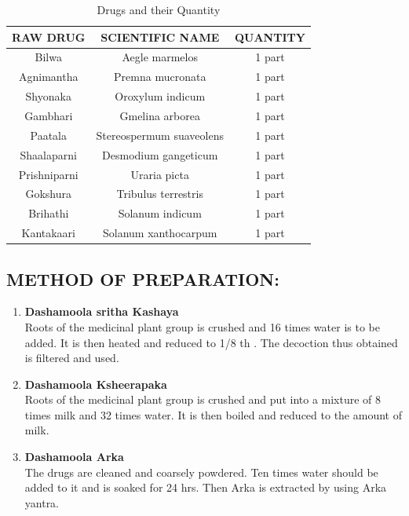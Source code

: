 \documentclass[11pt]{report} %
\begin{document}
\begin{table}[h]
	\centering
	\caption{Drugs and their Quantity}
	\label{tab:Raw Drug}
	\begin{tabular}{|c|c|c|}
		\hline
		RAW DRUG                            & SCIENTIFIC NAME          & QUANTITY         \\ \hline
		Bilwa                               & Aegle marmelos           & 1 part   \\ \hline
		Agnimantha                          & Premna mucronata         & 1 part   \\ \hline
		Shyonaka                            & Oroxylum indicum         & 1 part   \\ \hline
		Gambhari                            & Gmelina arborea          & 1 part   \\ \hline
		Paatala                             & Stereospermum suaveolens & 1 part   \\ \hline
		Shaalaparni                         & Desmodium gangeticum     & 1 part   \\ \hline
		Prishniparni                        & Uraria picta             & 1 part   \\ \hline
		Gokshura                            & Tribulus terrestris      & 1 part   \\ \hline
		Brihathi                            & Solanum indicum          & 1 part   \\ \hline
		Kantakaari                          & Solanum xanthocarpum     & 1 part   \\ \hline
	\end{tabular}
\end{table}


\subsection*{METHOD OF PREPARATION:}

\begin{enumerate}
	\item \textbf{Dashamoola sritha Kashaya}\\
	Roots of the medicinal plant group is crushed and 16 times water is to be added. It is then heated and reduced to 1/8 th . The decoction thus obtained is filtered and used.
	\item \textbf{Dashamoola Ksheerapaka}\\
	Roots of the medicinal plant group is crushed and put into a mixture of 8 times milk and 32 times water. It is then boiled and reduced to the amount of milk.
	\item \textbf{Dashamoola Arka}\\
	The drugs are cleaned and coarsely powdered. Ten times water should be added to it and is
	soaked for 24 hrs. Then Arka is extracted by using Arka yantra.
\end{enumerate}
\end{document}
